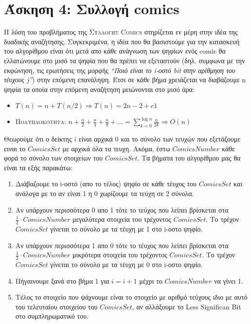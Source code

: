 \documentclass[a4paper,12pt]{report}
\begin{document}
\section*{Άσκηση 4: Συλλογή comics}
Η λύση του προβλήματος της \textsc{Συλλογής Comics} στηρίζεται εν μέρη στην ιδέα της δυαδικής αναζήτησης. Συγκεκριμένα, η ιδέα που θα βασιστούμε για την κατασκευή του αλγορίθμου είναι ότι μετά απο κάθε ανάγνωση των ψηφίων ενός comic θα ελλατώνουμε στο μισό τα ψηφία που θα πρέπει να εξεταστούν (δηλ. συμφωνα με την εκφώνηση, τις ερωτήσεις της μορφής \textit{``Ποιό είναι το i-οστό bit στην αρίθμηση του τέυχους j''}) στην επόμενη επανάληψη. Έτσι σε κάθε βήμα χρειάζεται να διαβάζουμε n ψηφία τα οποία στην επόμενη αναζήτηση μειώνονται στο μισό άρα:

\begin{itemize}
 \item $T(n)=n+T(n/2)\Longrightarrow T(n)=2n-2+c1$
 \item \textsc{Πολυπλοκότητα}: $n+\frac{n}{2}+\frac{n}{4}+\frac{n}{8}+...=\sum_{k=0}^{\log n}\frac{n}{2k} \Longrightarrow O(n)$
\end{itemize}

Θεωρούμε ότι ο δείκτης $i$ είναι αρχικά 0 και το σύνολο των τευχών που εξετάζουμε ειναι το $ComicsSet$ με αρχικά όλα τα τευχη. Ακόμα, έστω $ComicsNumber$ κάθε φορά το σύνολο των στοιχείων του $ComicsSet$. Τα βήματα του αλγορίθμου μας θα είναι τα εξής παρακάτω:
\begin{enumerate}
 \item Διάβαζουμε το i-οστό (απο το τέλος) ψηφίο σε κάθε τέυχος του $ComicsSet$ και ανάλογα με το αν είναι 1 η 0 χωρίζουμε τα τεύχη σε 2 σύνολα.
 \item Αν υπάρχουν περισσότερα 0 απο 1 τότε το τεύχος που λείπει βρίσκεται στα $\frac{1}{2} \cdot ComicsNumber$ μεγαλύτερα στοιχεία του τρέχοντος $ComicsSet$. Το τρέχον $ComicsSet$ γίνεται το σύνολο με τα τέυχη με 1 στο i-οστο ψηφίο. 
 \item Αν υπάρχουν περισσότερα 1 απο 0 τότε το τέυχος που λείπει βρίσκεται στα $\frac{1}{2} \cdot ComicsNumber$ μικρότερα στοιχεία του τρέχοντος $ComicsSet$. Το τρέχον $ComicsSet$ γίνεται το σύνολο με τα τέυχη με 0 στο i-οστο ψηφίο.
 \item Πήγαινουμε ξανά στο βήμα 1 για $i = i+1$ μέχρι το $ComicsNumber$ να γίνει 1.
 \item Τέλος το στοιχείο που ψάχνουμε είναι το στοιχείο με αριθμό τεύχους ιδιο με αυτό του τελευταίου στοιχείου του $ComicsSet$, αν αλλάξουμε το Less Significan Bit στο συμπληρωματικό του.
\end{enumerate}
\end{document}
